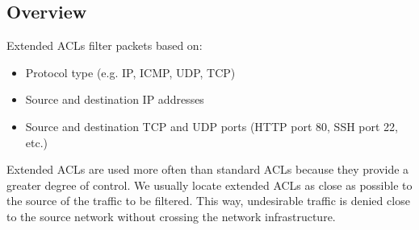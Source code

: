 \subsection{Overview}
Extended ACLs filter packets based on:
	\begin{itemize}
	\item Protocol type (e.g. IP, ICMP, UDP, TCP)
	\item Source and destination IP addresses
	\item Source and destination TCP and UDP ports (HTTP port 80, SSH port 22, etc.)
	\end{itemize}
Extended ACLs are used more often than standard ACLs because they provide a greater degree of control. We usually locate extended ACLs as close as possible to the source of the traffic to be filtered. This way, undesirable traffic is denied close to the source network without crossing the network infrastructure.
